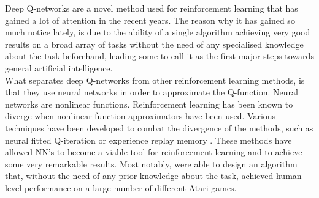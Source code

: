 Deep Q-networks\cite{mnih2013playing} are a novel method used for reinforcement learning that has gained a lot of attention in the recent years. The reason why it has gained so much notice lately, is due to the ability of a single algorithm achieving very good results on a broad array of tasks without the need of any specialised knowledge about the task beforehand, leading some to call it as the first major steps towards general artificial intelligence.\\
What separates deep Q-networks from other reinforcement learning methods, is that they use neural networks in order to approximate the Q-function. Neural networks are nonlinear functions. Reinforcement learning has been known to diverge when nonlinear function approximators have been used. Various techniques have been developed to combat the divergence of the methods, such as neural fitted Q-iteration \cite{riedmiller2005neural} or experience replay memory \cite{Mnih2015}. These methods have allowed NN's to become a viable tool for reinforcement learning and to achieve some very remarkable results. Most notably, \cite{Mnih2015} were able to design an algorithm that, without the need of any prior knowledge about the task, achieved human level performance on a large number of different Atari games.

































